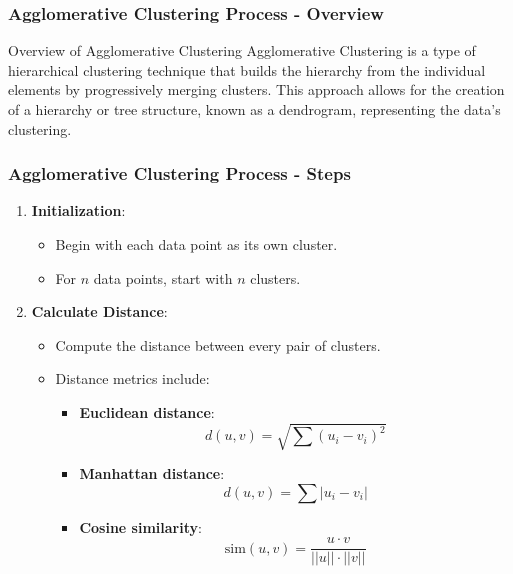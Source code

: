 \documentclass[aspectratio=169]{beamer}
\begin{document}
\begin{frame}[fragile]
    \frametitle{Agglomerative Clustering Process - Overview}
    \begin{block}{Overview of Agglomerative Clustering}
        Agglomerative Clustering is a type of hierarchical clustering technique that builds the hierarchy from the individual elements by progressively merging clusters. This approach allows for the creation of a hierarchy or tree structure, known as a dendrogram, representing the data's clustering.
    \end{block}
\end{frame}

\begin{frame}[fragile]
    \frametitle{Agglomerative Clustering Process - Steps}
    \begin{enumerate}
        \item \textbf{Initialization}:
        \begin{itemize}
            \item Begin with each data point as its own cluster.
            \item For \( n \) data points, start with \( n \) clusters.
        \end{itemize}
        
        \item \textbf{Calculate Distance}:
        \begin{itemize}
            \item Compute the distance between every pair of clusters. 
            \item Distance metrics include:
                \begin{itemize}
                    \item \textbf{Euclidean distance}:  
                    \[
                    d(u, v) = \sqrt{\sum{(u_i - v_i)^2}}
                    \]
                    \item \textbf{Manhattan distance}:  
                    \[
                    d(u, v) = \sum{|u_i - v_i|}
                    \]
                    \item \textbf{Cosine similarity}:  
                    \[
                    \text{sim}(u, v) = \frac{u \cdot v}{||u|| \cdot ||v||}
                    \]
                \end{itemize}
        \end{itemize}
    \end{enumerate}
\end{frame}
\end{document}
